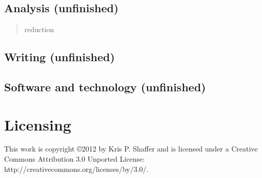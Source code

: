 \section{Analysis (unfinished)}
\label{analysisunfinished}

\begin{quote}

reduction
\end{quote}

\section{Writing (unfinished)}
\label{writingunfinished}

\section{Software and technology (unfinished)}
\label{softwareandtechnologyunfinished}

\chapter{Licensing}
\label{licensing}

This work is copyright ©2012 by Kris P. Shaffer and is licensed under a Creative Commons Attribution 3.0 Unported License: http:/\slash creativecommons.org\slash licenses\slash by\slash 3.0\slash .




